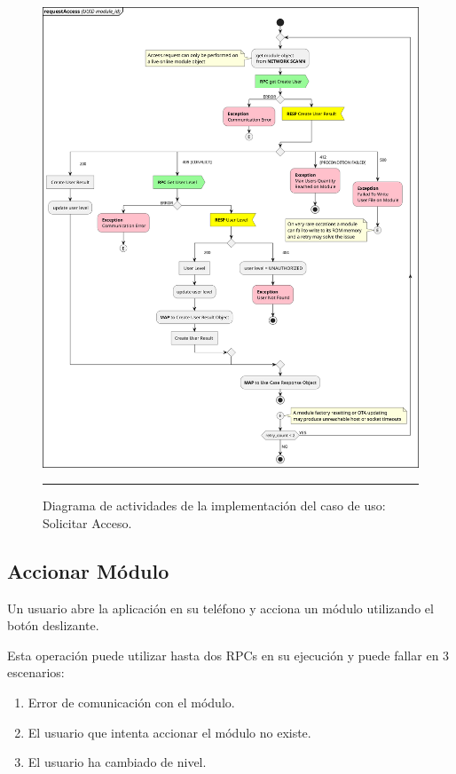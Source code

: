 \begin{figure}[htbp]
	\centering
	\includegraphics[width=\textwidth]{Figures/iter1/ACT_request_ink.png}
	\rule{35em}{1pt}
	\caption[Actividades Solicitar Acceso]{Diagrama de actividades de la implementación del caso de uso: Solicitar Acceso.}
	\label{fig:act_request}
\end{figure}

\subsection{Accionar Módulo}
Un usuario abre la aplicación en su teléfono y acciona un módulo utilizando el botón deslizante.

Esta operación puede utilizar hasta dos RPCs en su ejecución y puede fallar en 3 escenarios:

\begin{enumerate}
	\item Error de comunicación con el módulo.
	\item El usuario que intenta accionar el módulo no existe.
	\item El usuario ha cambiado de nivel.
\end{enumerate}


